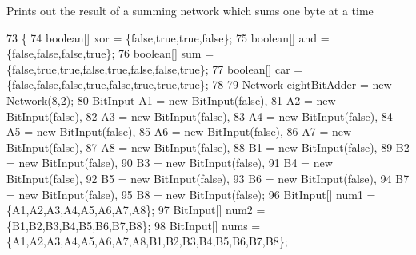 Prints out the result of a summing network which sums one byte at a time 
\begin{DoxyCode}
73                                           \{
74         \textcolor{keywordtype}{boolean}[] xor = \{\textcolor{keyword}{false},\textcolor{keyword}{true},\textcolor{keyword}{true},\textcolor{keyword}{false}\};
75         \textcolor{keywordtype}{boolean}[] and = \{\textcolor{keyword}{false},\textcolor{keyword}{false},\textcolor{keyword}{false},\textcolor{keyword}{true}\};
76         \textcolor{keywordtype}{boolean}[] sum = \{\textcolor{keyword}{false},\textcolor{keyword}{true},\textcolor{keyword}{true},\textcolor{keyword}{false},\textcolor{keyword}{true},\textcolor{keyword}{false},\textcolor{keyword}{false},\textcolor{keyword}{true}\};
77         \textcolor{keywordtype}{boolean}[] car = \{\textcolor{keyword}{false},\textcolor{keyword}{false},\textcolor{keyword}{false},\textcolor{keyword}{true},\textcolor{keyword}{false},\textcolor{keyword}{true},\textcolor{keyword}{true},\textcolor{keyword}{true}\};
78         
79         Network eightBitAdder = \textcolor{keyword}{new} Network(8,2);
80         BitInput A1 = \textcolor{keyword}{new} BitInput(\textcolor{keyword}{false}),
81         A2 = \textcolor{keyword}{new} BitInput(\textcolor{keyword}{false}),
82         A3 = \textcolor{keyword}{new} BitInput(\textcolor{keyword}{false}),
83         A4 = \textcolor{keyword}{new} BitInput(\textcolor{keyword}{false}),
84         A5 = \textcolor{keyword}{new} BitInput(\textcolor{keyword}{false}),
85         A6 = \textcolor{keyword}{new} BitInput(\textcolor{keyword}{false}),
86         A7 = \textcolor{keyword}{new} BitInput(\textcolor{keyword}{false}),
87         A8 = \textcolor{keyword}{new} BitInput(\textcolor{keyword}{false}),
88         B1 = \textcolor{keyword}{new} BitInput(\textcolor{keyword}{false}),
89         B2 = \textcolor{keyword}{new} BitInput(\textcolor{keyword}{false}),
90         B3 = \textcolor{keyword}{new} BitInput(\textcolor{keyword}{false}),
91         B4 = \textcolor{keyword}{new} BitInput(\textcolor{keyword}{false}),
92         B5 = \textcolor{keyword}{new} BitInput(\textcolor{keyword}{false}),
93         B6 = \textcolor{keyword}{new} BitInput(\textcolor{keyword}{false}),
94         B7 = \textcolor{keyword}{new} BitInput(\textcolor{keyword}{false}),
95         B8 = \textcolor{keyword}{new} BitInput(\textcolor{keyword}{false});
96         BitInput[] num1 = \{A1,A2,A3,A4,A5,A6,A7,A8\};
97         BitInput[] num2 = \{B1,B2,B3,B4,B5,B6,B7,B8\};
98         BitInput[] nums = \{A1,A2,A3,A4,A5,A6,A7,A8,B1,B2,B3,B4,B5,B6,B7,B8\};

\end{DoxyCode}
